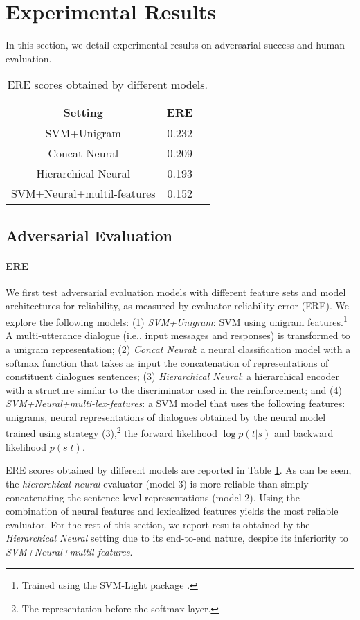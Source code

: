 \documentclass[11pt]{article}
\begin{document}
\section{Experimental Results} \label{sec:experiments}
In this section, 
we detail experimental results on adversarial success and human evaluation.  

\begin{table}[htb]
\centering
\small
\begin{tabular}{ccc}
Setting&ERE\\\hline
SVM+Unigram&0.232\\
Concat Neural &0.209 \\
Hierarchical Neural &0.193 \\
SVM+Neural+multil-features&0.152 \\
\hline
\end{tabular}
\caption{ERE scores obtained by different models.}
\label{ERE}
\end{table} 


\subsection{Adversarial Evaluation}
\paragraph{ERE} We first test 
 adversarial evaluation models with different 
 feature sets and 
 model architectures for reliability, as measured by evaluator reliability error (ERE).
 We explore the following models:
   (1) {\it SVM+Unigram}:  SVM using unigram features.\footnote{Trained using the SVM-Light package \cite{joachims2002learning}.}
 A multi-utterance dialogue (i.e., input messages and responses) is transformed to a unigram representation; (2) 
{\it Concat Neural}: 
a neural classification model with 
a softmax function that takes as input the concatenation of representations of constituent dialogues sentences;
 (3) {\it Hierarchical Neural}: 
  a hierarchical encoder    
  with a  structure similar to the discriminator used in the reinforcement; and
  (4) 
  {\it SVM+Neural+multi-lex-features}: 
  a SVM model that uses the following features: unigrams,  neural representations of dialogues obtained by the neural model trained using strategy (3),\footnote{The representation before the softmax layer.} the forward likelihood $\log p(t|s)$ and backward likelihood $p(s|t)$.

ERE scores obtained by different models are reported in Table \ref{ERE}. 
As can be seen, the {\it hierarchical neural} evaluator (model 3) is more reliable than simply concatenating the sentence-level representations (model 2).
Using the combination of neural features and lexicalized features yields the most reliable evaluator. 
For the rest of this section, we report results obtained 
by the 
{\it Hierarchical Neural} setting due to its end-to-end nature, despite its inferiority to {\it SVM+Neural+multil-features}. 
\end{document}
